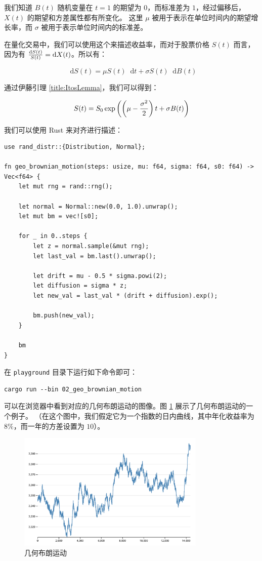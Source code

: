 \documentclass[utf8,a4paper,nofonts,9pt]{ctexbook}
\def\dif{\mathop{}\!\mathrm{d}}
\begin{document}
我们知道 $B(t)$ 随机变量在 $t = 1$ 的期望为 $0$，而标准差为 $1$，经过偏移后，$X(t)$ 的期望和方差属性都有所变化。
这里 $\mu$ 被用于表示在单位时间内的期望增长率，而 $\sigma$ 被用于表示单位时间内的标准差。

在量化交易中，我们可以使用这个来描述收益率，而对于股票价格 $S(t)$ 而言，因为有 ${\dif{S(t)} \over S(t)} = \dif{X(t)}$。所以有：

$$
\dif{S(t)} = \mu S(t) \dif{t} + \sigma S(t) \dif{B(t)}
$$

通过伊藤引理 \ref{title:ItosLemma}，我们可以得到：

$$
S(t) = S_0 \exp\left(\left(\mu - {\sigma^2 \over 2}\right)t + \sigma B(t)\right)
$$

我们可以使用 Rust 来对齐进行描述：

\begin{lstlisting}
use rand_distr::{Distribution, Normal};

fn geo_brownian_motion(steps: usize, mu: f64, sigma: f64, s0: f64) -> Vec<f64> {
    let mut rng = rand::rng();

    let normal = Normal::new(0.0, 1.0).unwrap();
    let mut bm = vec![s0];

    for _ in 0..steps {
        let z = normal.sample(&mut rng);
        let last_val = bm.last().unwrap();

        let drift = mu - 0.5 * sigma.powi(2);
        let diffusion = sigma * z;
        let new_val = last_val * (drift + diffusion).exp();

        bm.push(new_val);
    }

    bm
}
\end{lstlisting}

在 \verb|playground| 目录下运行如下命令即可：

\begin{lstlisting}
cargo run --bin 02_geo_brownian_motion
\end{lstlisting}

可以在浏览器中看到对应的几何布朗运动的图像。图 \ref{fig:geoBrownianMotion} 展示了几何布朗运动的一个例子。
（在这个图中，我们假定它为一个指数的日内曲线，其中年化收益率为 $8\%$，而一年的方差设置为 $10$）。

\begin{figure}[h]
    \centering
    \includegraphics[width=0.8\textwidth]{src/static/01_geo_brownian_motion.png}
    \caption{几何布朗运动}
    \label{fig:geoBrownianMotion}
\end{figure}
\end{document}
